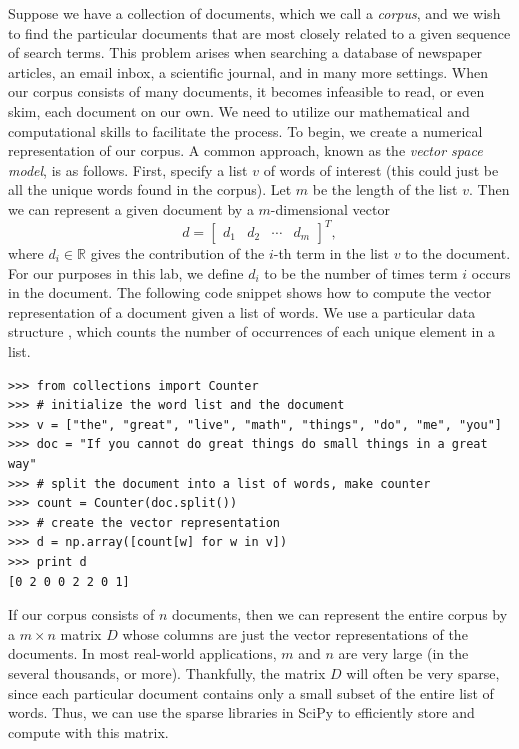 Suppose we have a collection of documents, which we call a \emph{corpus}, and we wish to find the particular documents
that are most closely related to a given sequence of search terms. 
This problem arises when searching a database of newspaper articles, an email inbox, a scientific journal, and in many more settings. 
When our corpus consists of many documents, it becomes infeasible to read, or even skim, each document on our own. 
We need to utilize our mathematical and computational skills to facilitate the process.
To begin, we create a numerical representation of our corpus. 
A common approach, known as the \emph{vector space model}, is as follows. 
First, specify a list $v$ of words of interest (this could just be all the unique words found in the corpus).
Let $m$ be the length of the list $v$. Then we can represent a given document by a $m$-dimensional vector 
\[
d = \begin{bmatrix}
d_1 & d_2 & \cdots & d_m
\end{bmatrix}^T,
\]
where $d_i \in \mathbb{R}$ gives the contribution of the $i$-th term in the list $v$ to the document. 
For our purposes in this lab, we define $d_i$ to be the number of times term $i$ occurs in the document.
The following code snippet shows how to compute the vector representation of a document given a list of words.
We use a particular data structure , which counts the number of occurrences of each unique element in a list.
\begin{lstlisting}
>>> from collections import Counter
>>> # initialize the word list and the document
>>> v = ["the", "great", "live", "math", "things", "do", "me", "you"]
>>> doc = "If you cannot do great things do small things in a great way"
>>> # split the document into a list of words, make counter
>>> count = Counter(doc.split())
>>> # create the vector representation
>>> d = np.array([count[w] for w in v])
>>> print d
[0 2 0 0 2 2 0 1]
\end{lstlisting}
If our corpus consists of $n$ documents, then we can represent the entire corpus by a $m \times n$ matrix
$D$ whose columns are just the vector representations of the documents. 
In most real-world applications, $m$ and $n$ are very large (in the several thousands, or more). 
Thankfully, the matrix $D$ will often be very sparse, since each particular document contains only a small subset
of the entire list of words.
Thus, we can use the sparse libraries in SciPy to efficiently store and compute with this matrix.

